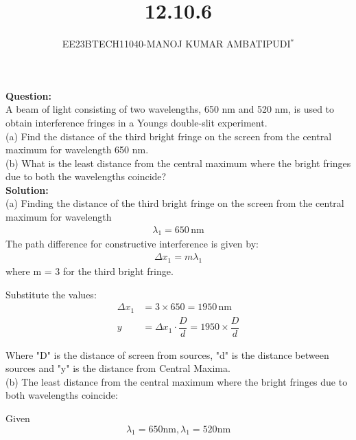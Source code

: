 \documentclass[journal,12pt,twocolumn]{IEEEtran}
\theoremstyle{remark}
\begin{document}

\vspace{3cm}

\title{\textbf{12.10.6}}
\author{EE23BTECH11040-MANOJ KUMAR AMBATIPUDI$^{*}$%
}
\maketitle
\newpage
\bigskip

\renewcommand{\thefigure}{\theenumi}
\renewcommand{\thetable}{\theenumi}

\textbf{Question:}
\\
A beam of light consisting of two wavelengths, 650 nm and 520 nm, is used to
obtain interference fringes in a Youngs double-slit experiment.\\
(a) Find the distance of the third bright fringe on the screen from
the central maximum for wavelength 650 nm.\\
(b) What is the least distance from the central maximum where the
bright fringes due to both the wavelengths coincide?
\\

\textbf{Solution:}
\\
(a) Finding the distance of the third bright fringe on the screen from the central maximum for wavelength
\begin{align}
\lambda_1 = 650 \, \text{nm}
\end{align}
The path difference for constructive interference is given by:
\begin{align}
\Delta x_1 = m\lambda_1     
\end{align}
where  m = 3  for the third bright fringe.

Substitute the values:
\begin{align}
\Delta x_1 &= 3\times650 = 1950 \, \text{nm} \\
y &= \Delta x_1\cdot\dfrac{D}{d} = 1950\times\dfrac{D}{d}
\end{align}

Where "D" is the distance of screen from sources, "d" is the distance between sources and "y" is the distance from Central Maxima.\\


(b) The least distance from the central maximum where the bright fringes due to both wavelengths coincide:

Given \[\lambda_1 = 650 \text{nm} ,\lambda_1 = 520 \text{nm}\]
\end{document}
